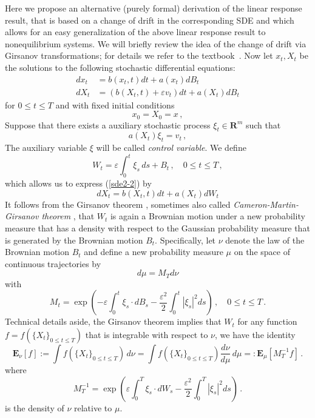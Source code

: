 \documentclass[]{tMPH2e}
\newcommand{\R}{{\mathbf R}}
\newcommand{\eps}{\varepsilon}
\newcommand{\bE}{{\mathbf E}}
\newcommand{\wrt}{with respect to }
\begin{document}
Here we propose an alternative (purely formal) derivation of the linear response result, that is based on a change of drift in the corresponding SDE and which allows for an easy generalization of the above linear response result to nonequilibrium systems. We will briefly review the idea of the change of drift via Girsanov transformations; for details we refer to the textbook~\cite{oksendal2003stochastic}. Now let $x_{t},X_{t}$ be the solutions to the following stochastic differential equations:
\begin{subequations}\label{sde2}
\begin{align}
dx_{t} & = b(x_{t},t)dt + a(x_{t})dB_{t} \label{sde2-1}\\
dX_{t} & = (b(X_{t},t) + \eps v_{t})dt +a(X_{t})dB_{t} \label{sde2-2}
\end{align}
\end{subequations}
for $0\le t\le T$ and with fixed initial conditions
\[
x_{0} = X_{0} = x\,,
\]
Suppose that there exists a auxiliary stochastic process $\xi_{t}\in\R^{m}$ such that 
\begin{equation}\label{xi}
a(X_{t})\xi_{t} = v_{t}\,,
\end{equation}
The auxiliary variable $\xi$ will be called \emph{control variable}. We define  
\[
W_{t} = \eps\int_{0}^{t}\xi_{s}\,ds + B_{t}\,,\quad 0\le t\le T\,,
\]
which allows us to express (\ref{sde2-2}) by
\begin{equation}\label{sde2-3}
dX_{t} = b(X_{t},t)dt +a(X_{t})dW_{t} 
\end{equation}
It follows from the Girsanov theorem \cite[Thm.~8.6.8]{oksendal2003}, sometimes also called \emph{Cameron-Martin-Girsanov theorem} \cite{a}, that $W_{t}$ is again a Brownian motion under a new probability measure that has a density \wrt the Gaussian probability measure that is generated by the Brownian motion $B_{t}$. Specifically, let $\nu$ denote the law of the Brownian motion $B_{t}$ and define a new probability measure $\mu$ on the space of continuous trajectories by 
\[
d\mu=M_{T}d\nu
\]
with 
\begin{equation}\label{likelihood}
M_{t} = \exp\left(-\eps\int_{0}^{t}\xi_{s}\cdot dB_{s} - \frac{\eps^{2}}{2}\int_{0}^{t}|\xi_{s}|^{2}ds\right)\,,\quad 0\le t\le T\,.
\end{equation}
Technical details aside, the Girsanov theorem implies that $W_{t}$  for any function $f=f(\{X_{t}\}_{0\le t\le T})$ that is integrable \wrt $\nu$, we have the identity
\[
\bE_{\nu}[f] := \int f(\{X_{t}\}_{0\le t\le T})\, d\nu = \int f(\{X_{t}\}_{0\le t\le T}) \frac{d\nu}{d\mu}\,d\mu =: \bE_{\mu}[M^{-1}_{T}f]\,.
\]
where 
\[
M_{T}^{-1} = \exp\left(\eps\int_{0}^{T}\xi_{s}\cdot dW_{s} - \frac{\eps^{2}}{2}\int_{0}^{T}|\xi_{s}|^{2}ds\right)\,.
\]
is the density of $\nu$ relative to $\mu$. 
\end{document}
